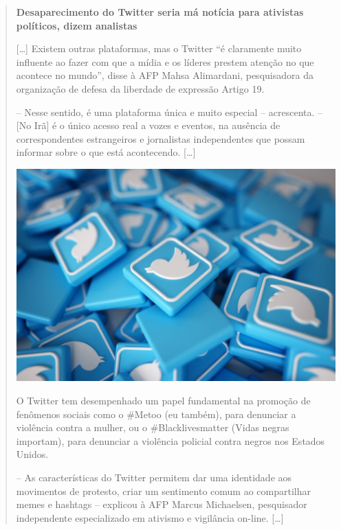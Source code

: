 \begin{quote}
\textbf{Desaparecimento do Twitter seria má notícia para ativistas
políticos, dizem analistas }

{[}\ldots{}{]}
Existem outras plataformas, mas o Twitter “é claramente muito influente
ao fazer com que a mídia e os líderes prestem atenção no que acontece no
mundo”, disse à AFP Mahsa Alimardani, pesquisadora da organização de
defesa da liberdade de expressão Artigo 19.

– Nesse sentido, é uma plataforma única e muito especial –
acrescenta. – {[}No Irã{]} é o único acesso real a vozes e eventos, na
ausência de correspondentes estrangeiros e jornalistas independentes que
possam informar sobre o que está acontecendo. {[}\ldots{}{]}

\noindent\includegraphics[width=\textwidth]{./imgs/img50.png}

O Twitter tem desempenhado um papel fundamental na promoção de fenômenos
sociais como o \#Metoo (eu também), para denunciar a violência contra a
mulher, ou o \#Blacklivesmatter (Vidas negras importam), para denunciar
a violência policial contra negros nos Estados Unidos.

– As características do Twitter permitem dar uma identidade aos
movimentos de protesto, criar um sentimento comum ao compartilhar memes
e hashtags – explicou à AFP Marcus Michaelsen, pesquisador independente especializado em ativismo e vigilância on-line. {[}\ldots{}{]}

\end{quote}


